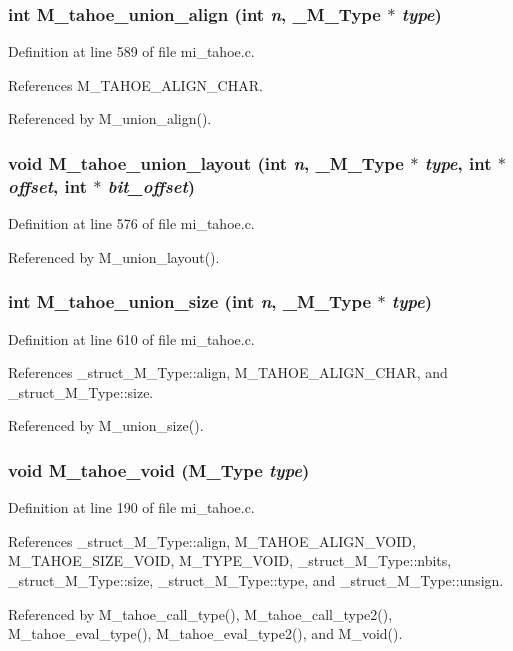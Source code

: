 \subsubsection{\setlength{\rightskip}{0pt plus 5cm}int M\_\-tahoe\_\-union\_\-align (int {\em n}, \bf{\_\-M\_\-Type} $\ast$ {\em type})}\label{m__tahoe_8h_c0c978cc4f5ad66c56c1c889a93ba8af}




Definition at line 589 of file mi\_\-tahoe.c.

References M\_\-TAHOE\_\-ALIGN\_\-CHAR.

Referenced by M\_\-union\_\-align().
\subsubsection{\setlength{\rightskip}{0pt plus 5cm}void M\_\-tahoe\_\-union\_\-layout (int {\em n}, \bf{\_\-M\_\-Type} $\ast$ {\em type}, int $\ast$ {\em offset}, int $\ast$ {\em bit\_\-offset})}\label{m__tahoe_8h_f222120dd33a020d9109be846e2fe686}




Definition at line 576 of file mi\_\-tahoe.c.

Referenced by M\_\-union\_\-layout().
\subsubsection{\setlength{\rightskip}{0pt plus 5cm}int M\_\-tahoe\_\-union\_\-size (int {\em n}, \bf{\_\-M\_\-Type} $\ast$ {\em type})}\label{m__tahoe_8h_12cc409b38378a099466730bf3e3679b}




Definition at line 610 of file mi\_\-tahoe.c.

References \_\-struct\_\-M\_\-Type::align, M\_\-TAHOE\_\-ALIGN\_\-CHAR, and \_\-struct\_\-M\_\-Type::size.

Referenced by M\_\-union\_\-size().
\subsubsection{\setlength{\rightskip}{0pt plus 5cm}void M\_\-tahoe\_\-void (\bf{M\_\-Type} {\em type})}\label{m__tahoe_8h_d615fccd186804ec8b7fa8bdce96a550}




Definition at line 190 of file mi\_\-tahoe.c.

References \_\-struct\_\-M\_\-Type::align, M\_\-TAHOE\_\-ALIGN\_\-VOID, M\_\-TAHOE\_\-SIZE\_\-VOID, M\_\-TYPE\_\-VOID, \_\-struct\_\-M\_\-Type::nbits, \_\-struct\_\-M\_\-Type::size, \_\-struct\_\-M\_\-Type::type, and \_\-struct\_\-M\_\-Type::unsign.

Referenced by M\_\-tahoe\_\-call\_\-type(), M\_\-tahoe\_\-call\_\-type2(), M\_\-tahoe\_\-eval\_\-type(), M\_\-tahoe\_\-eval\_\-type2(), and M\_\-void().